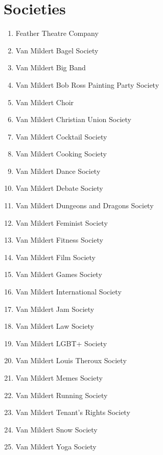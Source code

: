 \documentclass[12pt]{article}  %
\begin{document}
\section{Societies}
\begin{enumerate}[]
    \item Feather Theatre Company
    \item Van Mildert Bagel Society
    \item Van Mildert Big Band
    \item Van Mildert Bob Ross Painting Party Society
    \item Van Mildert Choir
    \item Van Mildert Christian Union Society
    \item Van Mildert Cocktail Society
    \item Van Mildert Cooking Society
    \item Van Mildert Dance Society
    \item Van Mildert Debate Society
    \item Van Mildert Dungeons and Dragons Society
    \item Van Mildert Feminist Society
    \item Van Mildert Fitness Society
    \item Van Mildert Film Society
    \item Van Mildert Games Society
    \item Van Mildert International Society
    \item Van Mildert Jam Society
    \item Van Mildert Law Society
    \item Van Mildert LGBT+ Society
    \item Van Mildert Louis Theroux Society
    \item Van Mildert Memes Society
    \item Van Mildert Running Society
    \item Van Mildert Tenant’s Rights Society
    \item Van Mildert Snow Society
    \item Van Mildert Yoga Society
\end{enumerate}
\end{document}
